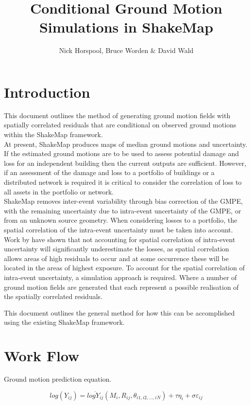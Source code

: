 \documentclass[11pt, oneside]{article}   	%
\title{Conditional Ground Motion Simulations in ShakeMap}
\author{Nick Horspool, Bruce Worden & David Wald}
\begin{document}
\maketitle

\section{Introduction}

This document outlines the method of generating ground motion fields with spatially correlated residuals that are conditional on observed ground motions within the ShakeMap framework. \\

At present, ShakeMap produces maps of median ground motions and uncertainty. If the estimated ground motions are to be used to assess potential damage and loss for an independent building then the current outputs are sufficient.  However, if an assessment of the damage and loss to a portfolio of buildings or a distributed network is required it is critical to consider the correlation of loss to all assets in the portfolio or network. \\

ShakeMap removes inter-event variability through bias correction of the GMPE, with the remaining uncertainty due to intra-event uncertainty of the GMPE, or from an unknown source geometry. When considering losses to a portfolio, the spatial correlation of the intra-event uncertainty must be taken into account. Work by \citet{park2007} have shown that not accounting for spatial correlation of intra-event uncertainty will significantly underestimate the losses, as spatial correlation allows areas of high residuals to occur and at some occurrence these will be located in the areas of highest exposure. To account for the spatial correlation of intra-event uncertainty, a simulation approach is required. Where a number of ground motion fields are generated that each represent a possible realisation of the spatially correlated residuals. 

This document outlines the general method for how this can be accomplished using the existing ShakeMap framework. 

\section{Work Flow}

Ground motion prediction equation. 

\begin{equation}
log(Y_{ij}) = \overline{log Y_{ij}} (M_i, R_{ij}, \theta_{i1,i2,...,iN} ) + \tau \eta_i + \sigma \varepsilon_{ij}
\label{eq_gmpe}
\end{equation}
\end{document}

